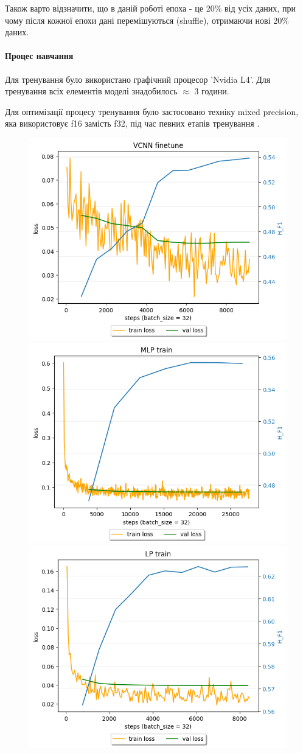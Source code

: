 \documentclass{udstu}
\begin{document}
Також варто відзначити, що в даній роботі епоха - це 20\% від усіх даних,
при чому після кожної епохи дані перемішуються (shuffle), отримаючи
нові 20\% даних.


\paragraph{\textbf{Процес навчання}\\}

Для тренування було використано графічний процесор 'Nvidia L4'.
Для тренування всіх елементів моделі знадобилось $\approx$ 3 години.

Для оптимізації процесу тренування було застосовано техніку mixed precision,
яка використовує f16 замість f32, під час певних етапів тренування \cite{mixed-precision}.


\begin{figure}[h]
\centering
		{\includegraphics[width=0.495\linewidth]{PNG/vcnn-train}}
		{\includegraphics[width=0.495\linewidth]{PNG/mlp-train}}
		{\includegraphics[width=0.495\linewidth]{PNG/lp-train}}

\end{figure}
\end{document}

